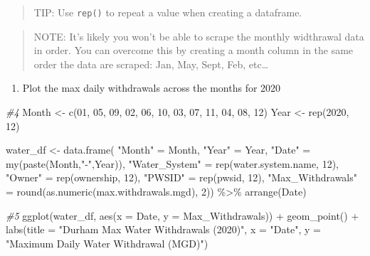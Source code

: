\documentclass[
]{article}
\newenvironment{Shaded}{\begin{snugshade}}{\end{snugshade}}
\newcommand{\AttributeTok}[1]{\textcolor[rgb]{0.77,0.63,0.00}{#1}}
\newcommand{\CommentTok}[1]{\textcolor[rgb]{0.56,0.35,0.01}{\textit{#1}}}
\newcommand{\DecValTok}[1]{\textcolor[rgb]{0.00,0.00,0.81}{#1}}
\newcommand{\FunctionTok}[1]{\textcolor[rgb]{0.00,0.00,0.00}{#1}}
\newcommand{\NormalTok}[1]{#1}
\newcommand{\OtherTok}[1]{\textcolor[rgb]{0.56,0.35,0.01}{#1}}
\newcommand{\SpecialCharTok}[1]{\textcolor[rgb]{0.00,0.00,0.00}{#1}}
\newcommand{\StringTok}[1]{\textcolor[rgb]{0.31,0.60,0.02}{#1}}
\providecommand{\tightlist}{%
  \setlength{\itemsep}{0pt}\setlength{\parskip}{0pt}}
\begin{document}
\begin{quote}
TIP: Use \texttt{rep()} to repeat a value when creating a dataframe.
\end{quote}

\begin{quote}
NOTE: It's likely you won't be able to scrape the monthly widthrawal
data in order. You can overcome this by creating a month column in the
same order the data are scraped: Jan, May, Sept, Feb, etc\ldots{}
\end{quote}

\begin{enumerate}
\def\labelenumi{\arabic{enumi}.}
\setcounter{enumi}{4}
\tightlist
\item
  Plot the max daily withdrawals across the months for 2020
\end{enumerate}

\begin{Shaded}
\begin{Highlighting}[]
\CommentTok{\#4}
\NormalTok{Month }\OtherTok{\textless{}{-}} \FunctionTok{c}\NormalTok{(}\DecValTok{01}\NormalTok{, }\DecValTok{05}\NormalTok{, }\DecValTok{09}\NormalTok{, }\DecValTok{02}\NormalTok{, }\DecValTok{06}\NormalTok{, }\DecValTok{10}\NormalTok{, }\DecValTok{03}\NormalTok{, }\DecValTok{07}\NormalTok{, }\DecValTok{11}\NormalTok{, }\DecValTok{04}\NormalTok{, }\DecValTok{08}\NormalTok{, }\DecValTok{12}\NormalTok{)}
\NormalTok{Year }\OtherTok{\textless{}{-}} \FunctionTok{rep}\NormalTok{(}\DecValTok{2020}\NormalTok{, }\DecValTok{12}\NormalTok{)}

\NormalTok{water\_df }\OtherTok{\textless{}{-}} \FunctionTok{data.frame}\NormalTok{(}
  \StringTok{"Month"} \OtherTok{=}\NormalTok{ Month,}
  \StringTok{"Year"} \OtherTok{=}\NormalTok{ Year,}
  \StringTok{"Date"} \OtherTok{=} \FunctionTok{my}\NormalTok{(}\FunctionTok{paste}\NormalTok{(Month,}\StringTok{"{-}"}\NormalTok{,Year)),}
  \StringTok{"Water\_System"} \OtherTok{=} \FunctionTok{rep}\NormalTok{(water.system.name, }\DecValTok{12}\NormalTok{),}
  \StringTok{"Owner"} \OtherTok{=} \FunctionTok{rep}\NormalTok{(ownership, }\DecValTok{12}\NormalTok{),}
  \StringTok{"PWSID"} \OtherTok{=} \FunctionTok{rep}\NormalTok{(pwsid, }\DecValTok{12}\NormalTok{),}
  \StringTok{"Max\_Withdrawals"} \OtherTok{=} \FunctionTok{round}\NormalTok{(}\FunctionTok{as.numeric}\NormalTok{(max.withdrawals.mgd), }\DecValTok{2}\NormalTok{)) }\SpecialCharTok{\%\textgreater{}\%}
  \FunctionTok{arrange}\NormalTok{(Date)}


\CommentTok{\#5}
\FunctionTok{ggplot}\NormalTok{(water\_df, }\FunctionTok{aes}\NormalTok{(}\AttributeTok{x =}\NormalTok{ Date, }\AttributeTok{y =}\NormalTok{ Max\_Withdrawals)) }\SpecialCharTok{+}
  \FunctionTok{geom\_point}\NormalTok{() }\SpecialCharTok{+}
  \FunctionTok{labs}\NormalTok{(}\AttributeTok{title =} \StringTok{"Durham Max Water Withdrawals (2020)"}\NormalTok{, }\AttributeTok{x =} \StringTok{"Date"}\NormalTok{, }\AttributeTok{y =} \StringTok{"Maximum Daily Water Withdrawal (MGD)"}\NormalTok{)}
\end{Highlighting}
\end{Shaded}
\end{document}
